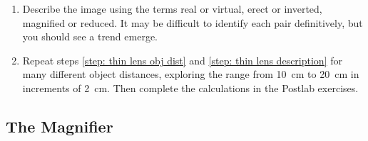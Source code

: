\documentclass[addpoints]{physlabs}
\begin{document}
\begin{labsection}
\begin{experiment}
\begin{enumerate}
        \item \label{step: thin lens description} Describe the image using the terms real or virtual, erect or inverted, magnified or reduced. It may be difficult to identify each pair definitively, but you should see a trend emerge.
        
        \item Repeat steps \ref{step: thin lens obj dist} and \ref{step: thin lens description} for many different object distances, exploring the range from \qty{10}{\centi\meter} to \qty{20}{\centi\meter} in increments of \qty{2}{\centi\meter}. Then complete the calculations in the Postlab exercises.
        
    
    \end{enumerate}

    \subsection*{The Magnifier}

    



\end{experiment}
\end{labsection}
\end{document}
